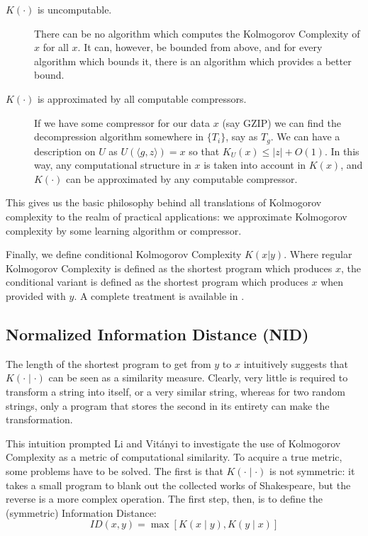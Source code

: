 \documentclass{article}
\begin{document}
\begin{description}
\item[$K(\cdot)$ is uncomputable.] There can be no algorithm which computes the Kolmogorov Complexity of $x$ for all $x$. It can, however, be bounded from above, and for every algorithm which bounds it, there is an algorithm which provides a better bound. 
\item[$K(\cdot)$ is approximated by all computable compressors.] If we have some compressor for our data $x$ (say GZIP) we can find the decompression algorithm somewhere in $\{T_i\}$, say as $T_g$. We can have a description on $U$ as $U(\langle g, z\rangle) = x$ so that $K_U(x)\leq |z| + O(1)$. In this way, any computational structure in $x$ is taken into account in $K(x)$, and $K(\cdot)$ can be approximated by any computable compressor.
\end{description}

This gives us the basic philosophy behind all translations of Kolmogorov complexity to the realm of practical applications: we approximate Kolmogorov complexity by some learning algorithm or compressor. 

Finally, we define conditional Kolmogorov Complexity $K(x| y)$. Where regular Kolmogorov Complexity is defined as the shortest program which produces $x$, the conditional variant is defined as the shortest program which produces $x$ when provided with $y$. A complete treatment is available in \cite{li1997introduction}.

\subsection*{Normalized Information Distance (NID)}

The length of the shortest program to get from $y$ to $x$ intuitively suggests that $K(\cdot\mid \cdot)$ can be seen as a similarity measure. Clearly, very little is required to transform a string into itself, or a very similar string, whereas for two random strings, only a program that stores the second in its entirety can make the transformation.

This intuition prompted Li and Vit{\'a}nyi \cite{li2004similarity} to investigate the use of Kolmogorov Complexity as a metric of computational similarity. To acquire a true metric, some problems have to be solved. The first is that $K(\cdot\mid \cdot)$ is not symmetric: it takes a small program to blank out the collected works of Shakespeare, but the reverse is a more complex operation. The first step, then, is to define the (symmetric) Information Distance:
\[
ID(x, y) = \max \left [K(x\mid y),K(y\mid x) \right ] 
\]  
\end{document}
